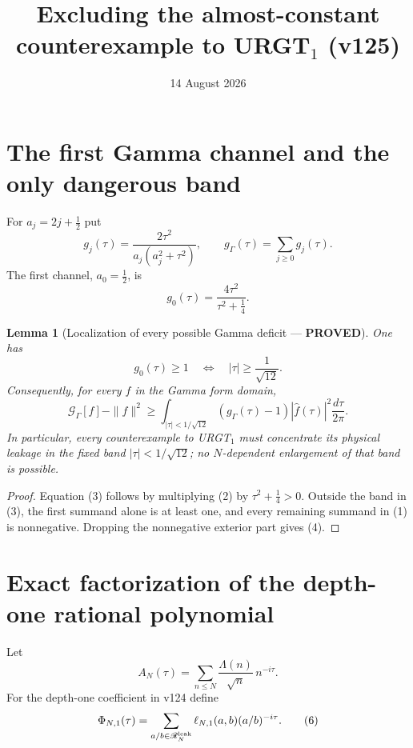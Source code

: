 \documentclass[11pt]{article}
\title{Excluding the almost-constant counterexample to URGT$_1$ (v125)}
\date{14 August 2026}
\newcommand{\PROVED}{\textcolor{green!40!black}{\textbf{PROVED}}}
\newtheorem{lemma}{Lemma}
\begin{document}
\maketitle

\section{The first Gamma channel and the only dangerous band}

For $a_j=2j+\frac12$ put
\begin{equation}
 g_j(\tau)=\frac{2\tau^2}{a_j(a_j^2+\tau^2)},
 \qquad g_\Gamma(\tau)=\sum_{j\ge0}g_j(\tau).              \tag{1}
\end{equation}
The first channel, $a_0=\frac12$, is
\begin{equation}
 g_0(\tau)=\frac{4\tau^2}{\tau^2+\frac14}.                \tag{2}
\end{equation}

\begin{lemma}[Localization of every possible Gamma deficit --- \PROVED]
One has
\begin{equation}
 g_0(\tau)\ge1
 \quad\Longleftrightarrow\quad
 |\tau|\ge\frac1{\sqrt{12}}.                              \tag{3}
\end{equation}
Consequently, for every $f$ in the Gamma form domain,
\begin{equation}
 \mathcal G_\Gamma[f]-\|f\|^2
 \ge
 \int_{|\tau|<1/\sqrt{12}}
       (g_\Gamma(\tau)-1)|\widehat f(\tau)|^2
       \frac{d\tau}{2\pi}.                               \tag{4}
\end{equation}
In particular, every counterexample to URGT$_1$ must concentrate its
physical leakage in the fixed band
$|\tau|<1/\sqrt{12}$; no $N$-dependent enlargement of that band is
possible.
\end{lemma}

\begin{proof}
Equation (3) follows by multiplying (2) by
$\tau^2+\frac14>0$.  Outside the band in (3), the first summand alone is
at least one, and every remaining summand in (1) is nonnegative.  Dropping
the nonnegative exterior part gives (4).
\end{proof}

\section{Exact factorization of the depth-one rational polynomial}

Let
\begin{equation}
 A_N(\tau)=\sum_{n\le N}\frac{\Lambda(n)}{\sqrt n}\,n^{-i\tau}.
                                                                    \tag{5}
\end{equation}
For the depth-one coefficient in v124 define
\begin{equation}
 \Phi_{N,1}(\tau)=
 \sum_{a/b\in\mathscr R_N^{\rm leak}}
 \ell_{N,1}(a,b)(a/b)^{-i\tau}.                            \tag{6}
\end{equation}
\end{document}

